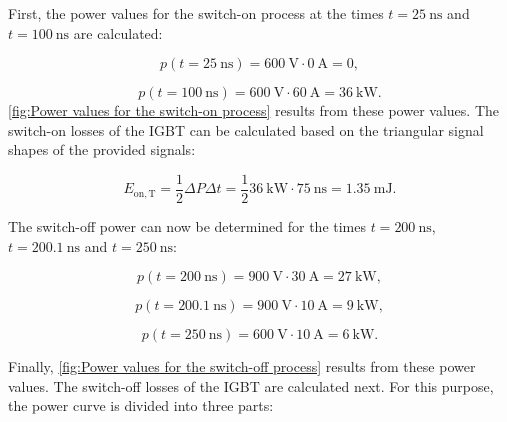 \begin{solutionblock}
First, the power values for the switch-on process at the times $t = \SI{25}{\ns}$ and $ t = \SI{100}{\ns}$ are calculated:

\begin{equation}
    p(t = \SI{25}{\ns}) = \SI{600}{\volt} \cdot \SI{0}{\ampere} = 0,
\end{equation}

\begin{equation}
    p(t = \SI{100}{\ns}) = \SI{600}{\volt} \cdot \SI{60}{\ampere} = \SI{36}{\kilo\watt}. 
\end{equation}
\autoref{fig:Power values for the switch-on process}  results from these power values.
The switch-on losses of the IGBT can be calculated based on the triangular signal shapes of the provided signals:
        
\begin{equation}
E_{\mathrm{on,T}} = \frac{1}{2} \Delta P \Delta t = \frac{1}{2} \SI{36}{\kilo\watt} \cdot \SI{75}{\ns} = \SI {1.35}{\milli\joule}.
\end{equation}

The switch-off power can now be determined for the times $t = \SI{200}{\ns}$, $t = \SI{200.1}{\ns}$ and $t = \SI{250}{\ns}$:

\begin{equation}
    p(t = \SI{200}{\ns}) = \SI{900}{\volt} \cdot \SI{30}{\ampere} = \SI{27}{\kilo\watt}, 
\end{equation}

\begin{equation}
    p(t = \SI{200.1}{\ns}) = \SI{900}{\volt} \cdot \SI{10}{\ampere} = \SI{9}{\kilo\watt}, 
\end{equation}

\begin{equation}
    p(t = \SI{250}{\ns}) = \SI{600}{\volt} \cdot \SI{10}{\ampere} = \SI{6}{\kilo\watt}. 
\end{equation}

Finally, \autoref{fig:Power values for the switch-off process} results from these power values. The switch-off losses of the IGBT are calculated next. For this purpose, the power curve is divided into three parts:
        

\end{solutionblock}
